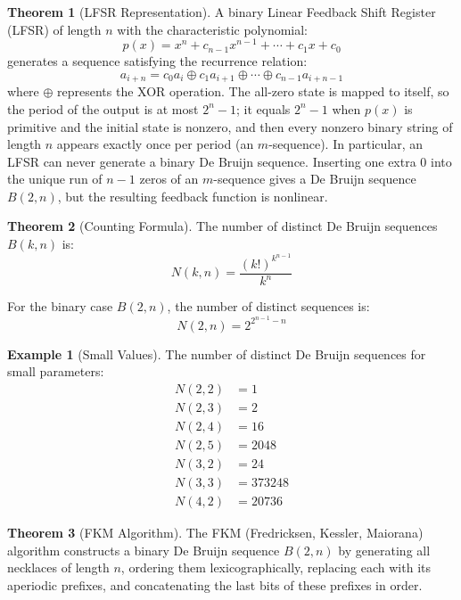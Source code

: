 \documentclass{article}
\theoremstyle{definition}
\newtheorem{example}{Example}
\newtheorem{theorem}{Theorem}
\begin{document}
\begin{theorem}[LFSR Representation]
A binary Linear Feedback Shift Register (LFSR) of length $n$ with the characteristic polynomial:
\begin{equation}
    p(x) = x^n + c_{n-1}x^{n-1} + \cdots + c_1x + c_0
\end{equation}
generates a sequence satisfying the recurrence relation:
\begin{equation}
    a_{i+n} = c_0a_i \oplus c_1a_{i+1} \oplus \cdots \oplus c_{n-1}a_{i+n-1}
\end{equation}
where $\oplus$ represents the XOR operation. The all-zero state is mapped to itself, so the period of the output is at most $2^n - 1$; it equals $2^n - 1$ when $p(x)$ is primitive and the initial state is nonzero, and then every nonzero binary string of length $n$ appears exactly once per period (an $m$-sequence). In particular, an LFSR can never generate a binary De Bruijn sequence. Inserting one extra $0$ into the unique run of $n-1$ zeros of an $m$-sequence gives a De Bruijn sequence $B(2, n)$, but the resulting feedback function is nonlinear.
\end{theorem}

\begin{theorem}[Counting Formula]
The number of distinct De Bruijn sequences $B(k, n)$ is:
\begin{equation}
    N(k, n) = \frac{(k!)^{k^{n-1}}}{k^n}
\end{equation}

For the binary case $B(2, n)$, the number of distinct sequences is:
\begin{equation}
    N(2, n) = 2^{2^{n-1}-n}
\end{equation}
\end{theorem}

\begin{example}[Small Values]
The number of distinct De Bruijn sequences for small parameters:
\begin{align}
    N(2, 2) &= 1 \\
    N(2, 3) &= 2 \\
    N(2, 4) &= 16 \\
    N(2, 5) &= 2048 \\
    N(3, 2) &= 24 \\
    N(3, 3) &= 373248 \\
    N(4, 2) &= 20736
\end{align}
\end{example}
\begin{theorem}[FKM Algorithm]
The FKM (Fredricksen, Kessler, Maiorana) algorithm constructs a binary De Bruijn sequence $B(2, n)$ by generating all necklaces of length $n$, ordering them lexicographically, replacing each with its aperiodic prefixes, and concatenating the last bits of these prefixes in order.
\end{theorem}
\end{document}
